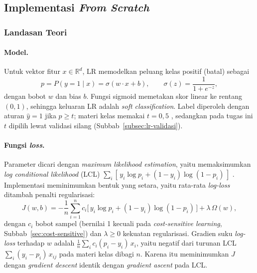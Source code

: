 \subsection{Implementasi \textit{From Scratch}}
\label{subsec:lr-implementasi}

\subsubsection{Landasan Teori}

\paragraph{Model.} Untuk vektor fitur $x \in \mathbb{R}^d$, LR memodelkan peluang kelas positif (batal) sebagai
\begin{equation}
	p = P(y = 1 \mid x) = \sigma(w \cdot x + b), \qquad \sigma(z) = \frac{1}{1 + e^{-z}},
	\label{eq:lr-model}
\end{equation}
dengan bobot $w$ dan bias $b$. Fungsi sigmoid memetakan skor linear ke rentang $(0, 1)$, sehingga keluaran LR adalah \textit{soft classification}. Label diperoleh dengan aturan $\hat{y} = 1$ jika $p \ge t$; materi kelas memakai $t = 0{,}5$ \cite{khodra-lr-what,khodra-lr-sga}, sedangkan pada tugas ini $t$ dipilih lewat validasi silang (Subbab~\ref{subsec:lr-validasi}).

\paragraph{Fungsi \textit{loss}.} Parameter dicari dengan \textit{maximum likelihood estimation}, yaitu memaksimumkan \textit{log conditional likelihood} (LCL) $\sum_i [\,y_i \log p_i + (1-y_i)\log(1-p_i)\,]$ \cite{khodra-lr-sga}. Implementasi meminimumkan bentuk yang setara, yaitu rata-rata \textit{log-loss} ditambah penalti regularisasi:
\begin{equation}
	J(w, b) = -\frac{1}{n}\sum_{i=1}^{n} c_i\big[\,y_i \log p_i + (1-y_i)\log(1-p_i)\,\big] + \lambda\,\Omega(w),
	\label{eq:lr-loss}
\end{equation}
dengan $c_i$ bobot sampel (bernilai 1 kecuali pada \textit{cost-sensitive learning}, Subbab~\ref{sec:cost-sensitive}) dan $\lambda \ge 0$ kekuatan regularisasi. Gradien suku \textit{log-loss} terhadap $w$ adalah $\frac{1}{n}\sum_i c_i(p_i - y_i)\,x_i$, yaitu negatif dari turunan LCL $\sum_i (y_i - p_i)\,x_{ij}$ pada materi kelas dibagi $n$. Karena itu meminimumkan $J$ dengan \textit{gradient descent} identik dengan \textit{gradient ascent} pada LCL.

